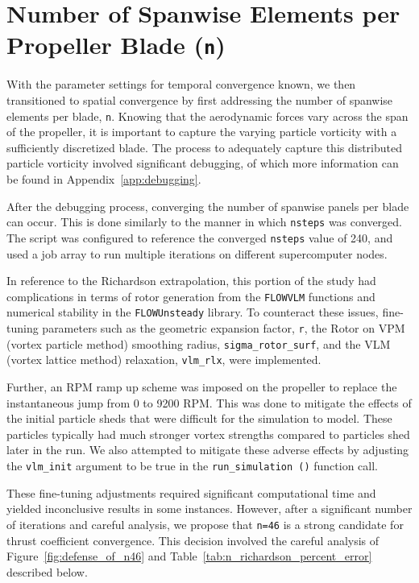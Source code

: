 \documentclass{article}
\begin{document}
\section{Number of Spanwise Elements per Propeller Blade (\texttt{n})}\label{n_convergence}
With the parameter settings for temporal convergence known, we then transitioned to spatial convergence by first addressing the number of spanwise elements per blade, \texttt{n}.
Knowing that the aerodynamic forces vary across the span of the propeller, it is important to capture the varying particle vorticity with a sufficiently discretized blade.
The process to adequately capture this distributed particle vorticity involved significant debugging, of which more information can be found in Appendix~\ref{app:debugging}.

\bigskip

After the debugging process, converging the number of spanwise panels per blade can occur.
This is done similarly to the manner in which \texttt{nsteps} was converged. The script was configured to reference the converged \texttt{nsteps} value of 240, and used a job array to run multiple iterations on different supercomputer nodes.

In reference to the Richardson extrapolation, this portion of the study had complications in terms of rotor generation from the \texttt{FLOWVLM} functions and numerical stability in the \texttt{FLOWUnsteady} library.
To counteract these issues, fine-tuning parameters such as the geometric expansion factor, \texttt{r}, the Rotor on VPM (vortex particle method) smoothing radius, \texttt{sigma\_rotor\_surf}, and the VLM (vortex lattice method) relaxation, \texttt{vlm\_rlx}, were implemented.

Further, an RPM ramp up scheme was imposed on the propeller to replace the instantaneous jump from 0 to 9200 RPM\@. This was done to mitigate the effects of the initial particle sheds that were difficult for the simulation to model.
These particles typically had much stronger vortex strengths compared to particles shed later in the run. We also attempted to mitigate these adverse effects by adjusting the \texttt{vlm\_init} argument to be true in the \texttt{run\_simulation ()} function call.

These fine-tuning adjustments required significant computational time and yielded inconclusive results in some instances. However, after a significant number of iterations and careful analysis, we propose that \texttt{n=46} is a strong candidate for thrust coefficient convergence.
This decision involved the careful analysis of Figure~\ref{fig:defense_of_n46} and Table~\ref{tab:n_richardson_percent_error} described below.
\end{document}
